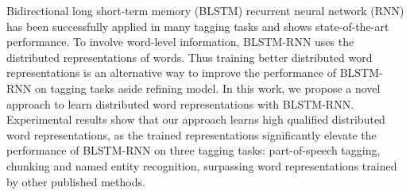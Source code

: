 Bidirectional long short-term memory (BLSTM) recurrent neural network (RNN) has been successfully applied in many tagging tasks and shows state-of-the-art performance. To involve word-level information, BLSTM-RNN uses the distributed representations of words. Thus training better distributed word representations is an alternative way to improve the performance of BLSTM-RNN on tagging tasks aside refining model. In this work, we propose a novel approach to learn distributed word representations with BLSTM-RNN. Experimental results show that our approach learns high qualified distributed word representations, as the trained representations significantly elevate the performance of BLSTM-RNN on three tagging tasks: part-of-speech tagging, chunking and named entity recognition, surpassing word representations trained by other published methods.

